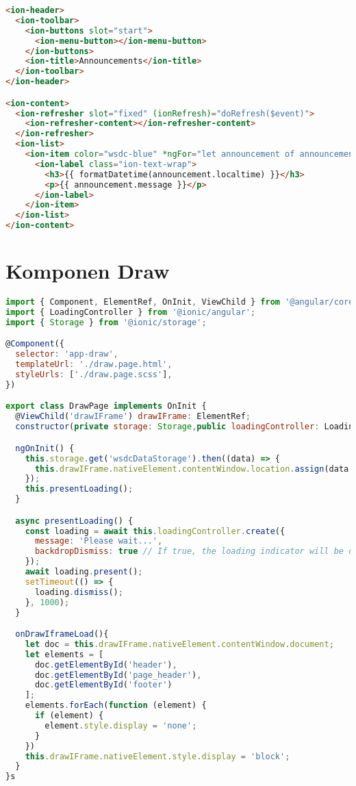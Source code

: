 \begin{lstlisting}[language=html, label={lst:announcements.page.html}, caption=annoncement.page.html]
<ion-header>
  <ion-toolbar>
    <ion-buttons slot="start">
      <ion-menu-button></ion-menu-button>
    </ion-buttons>
    <ion-title>Announcements</ion-title>
  </ion-toolbar>
</ion-header>

<ion-content>
  <ion-refresher slot="fixed" (ionRefresh)="doRefresh($event)">
    <ion-refresher-content></ion-refresher-content>
  </ion-refresher>
  <ion-list>
    <ion-item color="wsdc-blue" *ngFor="let announcement of announcements; let i = index">
      <ion-label class="ion-text-wrap">
        <h3>{{ formatDatetime(announcement.localtime) }}</h3>
        <p>{{ announcement.message }}</p>
      </ion-label>
    </ion-item>
  </ion-list>
</ion-content>
\end{lstlisting} 

\section{Komponen Draw} 
\label{sec:lampiranKomponenDraw}

\begin{lstlisting}[language=JavaScript, label={lst:draw.page.ts}, caption=draw.page.ts]
import { Component, ElementRef, OnInit, ViewChild } from '@angular/core';
import { LoadingController } from '@ionic/angular';
import { Storage } from '@ionic/storage';

@Component({
  selector: 'app-draw',
  templateUrl: './draw.page.html',
  styleUrls: ['./draw.page.scss'],
})

export class DrawPage implements OnInit {
  @ViewChild('drawIFrame') drawIFrame: ElementRef;
  constructor(private storage: Storage,public loadingController: LoadingController) { }

  ngOnInit() {
    this.storage.get('wsdcDataStorage').then((data) => {
      this.drawIFrame.nativeElement.contentWindow.location.assign(data.draws);
    });
    this.presentLoading();
  }

  async presentLoading() {
    const loading = await this.loadingController.create({
      message: 'Please wait...',
      backdropDismiss: true // If true, the loading indicator will be dismissed when the backdrop is clicked.
    });
    await loading.present();
    setTimeout(() => {
      loading.dismiss();
    }, 1000);
  }

  onDrawIframeLoad(){
    let doc = this.drawIFrame.nativeElement.contentWindow.document;
    let elements = [
      doc.getElementById('header'),
      doc.getElementById('page_header'),
      doc.getElementById('footer')
    ];
    elements.forEach(function (element) {
      if (element) {
        element.style.display = 'none';
      }
    })
    this.drawIFrame.nativeElement.style.display = 'block';
  }
}s
\end{lstlisting} 


